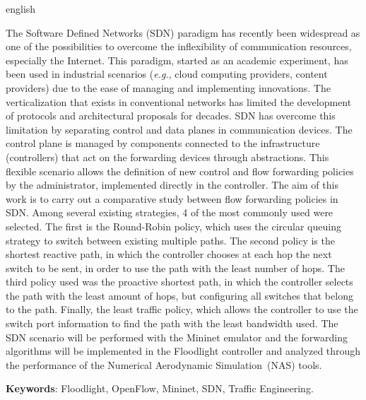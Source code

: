 
\begin{resumo}[Abstract]
 \begin{otherlanguage*}{english}

The Software Defined Networks (SDN)  paradigm has recently been widespread as one of the possibilities to overcome the inflexibility of communication resources, especially the Internet. This paradigm, started as an academic experiment, has been used in industrial scenarios (\textit{e.g.}, cloud computing providers, content providers) due to the ease of managing and implementing innovations. The verticalization that exists in conventional networks has limited the development of protocols and architectural proposals for decades. SDN has overcome this limitation by separating control and data planes in communication devices. 
The control plane is managed by components connected to the infrastructure (controllers) that act on the forwarding devices through abstractions. This flexible scenario allows the definition of new control and flow forwarding policies by the administrator, implemented directly in the controller. 
The aim of this work is to carry out a comparative study between flow forwarding policies in SDN. Among several existing strategies, 4 of the most commonly used were selected. The first is the Round-Robin policy, which uses the circular queuing strategy to switch between existing multiple paths. 
The second policy is the shortest reactive path, in which the controller chooses at each hop the next switch to be sent, in order to use the path with the least number of hops. 
The third policy used was the proactive shortest path, in which the controller selects the path with the least amount of hops, but configuring all switches that belong to the path. 
Finally, the least traffic policy, which allows the controller to use the switch port information to find the path with the least bandwidth used. The SDN scenario will be performed with the Mininet emulator and the forwarding algorithms will be implemented in the Floodlight controller and analyzed through the performance of the Numerical Aerodynamic Simulation~(NAS) tools.

   \textbf{Keywords}: Floodlight, OpenFlow, Mininet, SDN, Traffic Engineering.
 \end{otherlanguage*}
\end{resumo}
